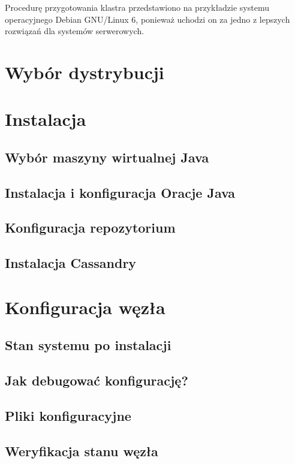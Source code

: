 \documentclass{article}
\begin{document}
Procedurę przygotowania klastra przedstawiono na przykładzie systemu operacyjnego Debian GNU/Linux 6, ponieważ uchodzi on za jedno z lepszych rozwiązań dla systemów serwerowych.

\section{Wybór dystrybucji}

\section{Instalacja}

\subsection{Wybór maszyny wirtualnej Java}

\subsection{Instalacja i konfiguracja Oracje Java}

\subsection{Konfiguracja repozytorium}

\subsection{Instalacja Cassandry}

\section{Konfiguracja węzła}

\subsection{Stan systemu po instalacji}

\subsection{Jak debugować konfigurację?}

\subsection{Pliki konfiguracyjne}

\subsection{Weryfikacja stanu węzła}
\end{document}
